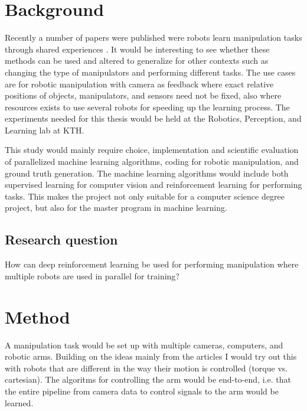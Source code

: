 \section{Background}

Recently a number of papers were published were robots learn manipulation tasks
through shared experiences
\cite{gu2016deep,finn2016deep,yahya2016collective,chebotar2016path}. It would
be interesting to see whether these methods can be used and altered to
generalize for other contexts such as changing the type of manipulators and
performing different tasks. The use cases are for robotic manipulation with
camera as feedback where exact relative positions of objects, manipulators, and
sensors need not be fixed, also where resources exists to use several robots
for speeding up the learning process. The experiments needed for this thesis would be held at the
Robotics, Perception, and Learning lab at KTH.

This study would mainly require choice, implementation and scientific
evaluation of parallelized machine learning algorithms, coding for robotic
manipulation, and ground truth generation. The machine learning algorithms
would include both supervised learning for computer vision and reinforcement
learning for performing tasks. This makes the project not only suitable for a
computer science degree project, but also for the master program in machine
learning.

\subsection{Research question}

How can deep reinforcement learning be used for performing manipulation where
multiple robots are used in parallel for training?

\section{Method}

A manipulation task would be set up with multiple cameras, computers, and
robotic arms. Building on the ideas mainly from the articles
\cite{gu2016deep,finn2016deep,yahya2016collective,chebotar2016path} I would try
out this with robots that are different in the way their motion is controlled
(torque vs. cartesian). The algoritms for controlling the arm would be
end-to-end, i.e. that the entire pipeline from camera data to control signals
to the arm would be learned.

